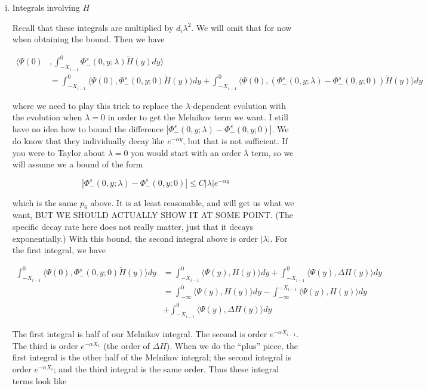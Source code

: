 \documentclass[12pt]{article}
\begin{document}
\begin{enumerate}
\begin{enumerate}[(i)]
\item Integrals involving $H$

Recall that these integrals are multiplied by $d_i \lambda^2$. We will omit that for now when obtaining the bound. Then we have

\begin{align*}
\langle \Psi(0)&, \int_{-X_{i-1}}^0 \Phi^s_-(0, y; \lambda) \tilde{H}(y) dy \rangle \\ 
&= \int_{-X_{i-1}}^0 \langle \Psi(0), \Phi^s_-(0, y; 0) \tilde{H}(y) \rangle dy + 
\int_{-X_{i-1}}^0 \langle \Psi(0), (\Phi^s_-(0, y; \lambda) - \Phi^s_-(0, y; 0)) \tilde{H}(y) \rangle dy
\end{align*}

where we need to play this trick to replace the $\lambda$-dependent evolution with the evolution when $\lambda = 0$ in order to get the Melnikov term we want. I still have no idea how to bound the difference $|\Phi^s_-(0, y; \lambda) - \Phi^s_-(0, y; 0)|$. We do know that they individually decay like $e^{-\alpha y}$, but that is not sufficient. If you were to Taylor about $\lambda = 0$ you would start with an order $\lambda$ term, so we will assume we a bound of the form

\[
|\Phi^s_-(0, y; \lambda) - \Phi^s_-(0, y; 0)| \leq C |\lambda| e^{-\alpha y}
\]

which is the same $p_6$ above. It is at least reasonable, and will get us what we want, BUT WE SHOULD ACTUALLY SHOW IT AT SOME POINT. (The specific decay rate here does not really matter, just that it decays exponentially.) With this bound, the second integral above is order $|\lambda|$. For the first integral, we have 

\begin{align*}
\int_{-X_{i-1}}^0 \langle \Psi(0), \Phi^s_-(0, y; 0) \tilde{H}(y) \rangle dy &= 
\int_{-X_{i-1}}^0 \langle \Psi(y), H(y) \rangle dy + \int_{-X_{i-1}}^0 \langle \Psi(y), \Delta H(y) \rangle dy \\
&= \int_{-\infty}^0 \langle \Psi(y), H(y) \rangle dy - \int_{-\infty}^{-X_{i-1}} \langle \Psi(y), H(y) \rangle dy \\
&+ \int_{-X_{i-1}}^0 \langle \Psi(y), \Delta H(y) \rangle dy 
\end{align*}

The first integral is half of our Melnikov integral. The second is order $e^{-\alpha X_{i-1}}$. The third is order $e^{-\alpha X_1}$ (the order of $\Delta H$). When we do the ``plus'' piece, the first integral is the other half of the Melnikov integral; the second integral is order $e^{-\alpha X_i}$; and the third integral is the same order.
Thus these integral terms look like


\end{enumerate}
\end{enumerate}
\end{document}
